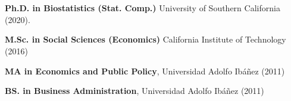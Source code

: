 \documentclass[letterpaper, 9pt]{article}
\newcommand{\myorange}{myteal!70!black}
\newcommand{\darkorange}{\myorange !50!black}
\renewcommand{\bf}{\bfseries\color{\myorange}}
\renewenvironment{itemize}{
  \begin{list}{}{
    \setlength{\leftmargin}{0.3cm}
  }
}{
  \end{list}
}
\begin{document}
\vspace{-.25cm}
\section*{\color{\darkorange}{Education}}
\vspace{-.25cm}

\begin{itemize}
\item 
{\bf Ph.D. in Biostatistics (Stat. Comp.)} University of Southern California (2020).

{\bf M.Sc. in Social Sciences (Economics)} California Institute of Technology (2016)

{\bf MA in Economics and Public Policy}, Universidad Adolfo Ib\'a\~nez (2011)

{\bf BS. in Business Administration}, Universidad Adolfo Ib\'a\~nez (2011)
\end{itemize}

\vspace{-.5cm}
\section*{\color{\darkorange}{Professional Experience}}
\vspace{-.25cm}
\end{document}
